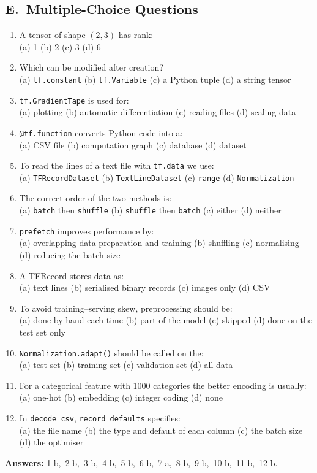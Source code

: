 \subsection*{E.\ Multiple-Choice Questions}
\begin{enumerate}
  \item A tensor of shape $(2,3)$ has rank: \\
  (a) 1 \quad (b) 2 \quad (c) 3 \quad (d) 6
  \item Which can be modified after creation? \\
  (a) \texttt{tf.constant} \quad (b) \texttt{tf.Variable} \quad (c) a Python tuple \quad (d) a string tensor
  \item \texttt{tf.GradientTape} is used for: \\
  (a) plotting \quad (b) automatic differentiation \quad (c) reading files \quad (d) scaling data
  \item \texttt{@tf.function} converts Python code into a: \\
  (a) CSV file \quad (b) computation graph \quad (c) database \quad (d) dataset
  \item To read the lines of a text file with \texttt{tf.data} we use: \\
  (a) \texttt{TFRecordDataset} \quad (b) \texttt{TextLineDataset} \quad (c) \texttt{range} \quad (d) \texttt{Normalization}
  \item The correct order of the two methods is: \\
  (a) \texttt{batch} then \texttt{shuffle} \quad (b) \texttt{shuffle} then \texttt{batch} \quad (c) either \quad (d) neither
  \item \texttt{prefetch} improves performance by: \\
  (a) overlapping data preparation and training \quad (b) shuffling \quad (c) normalising \quad (d) reducing the batch size
  \item A TFRecord stores data as: \\
  (a) text lines \quad (b) serialised binary records \quad (c) images only \quad (d) CSV
  \item To avoid training--serving skew, preprocessing should be: \\
  (a) done by hand each time \quad (b) part of the model \quad (c) skipped \quad (d) done on the test set only
  \item \texttt{Normalization.adapt()} should be called on the: \\
  (a) test set \quad (b) training set \quad (c) validation set \quad (d) all data
  \item For a categorical feature with 1000 categories the better encoding is usually: \\
  (a) one-hot \quad (b) embedding \quad (c) integer coding \quad (d) none
  \item In \texttt{decode\_csv}, \texttt{record\_defaults} specifies: \\
  (a) the file name \quad (b) the type and default of each column \quad (c) the batch size \quad (d) the optimiser
\end{enumerate}
\textbf{Answers:} 1-b,\ 2-b,\ 3-b,\ 4-b,\ 5-b,\ 6-b,\ 7-a,\ 8-b,\ 9-b,\ 10-b,\ 11-b,\ 12-b.

